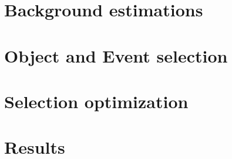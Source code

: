 \section{Background estimations}\label{sswwupgrade:background}


\section{Object and Event selection}\label{sswwupgrade:object_event_selection}


\section{Selection optimization}\label{sswwupgrade:optimization}


\section{Results}\label{sswwupgrade:results}

